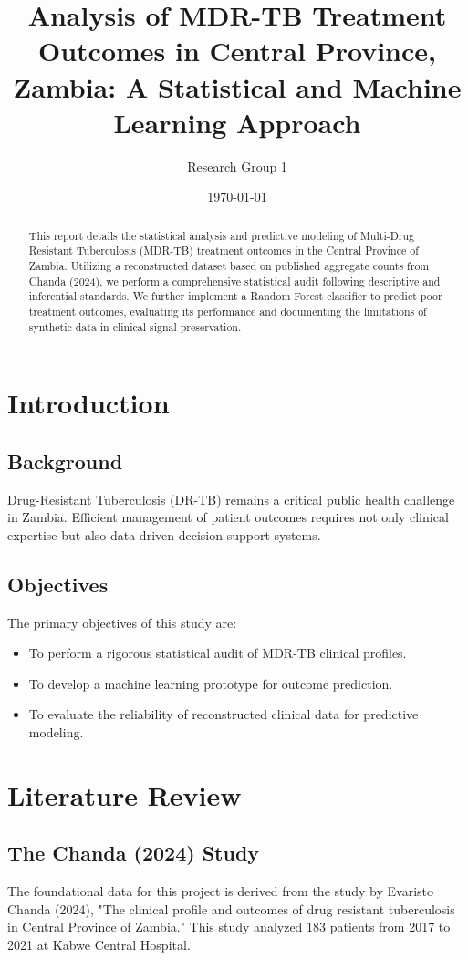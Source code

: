\documentclass[12pt,a4paper]{report}
\title{Analysis of MDR-TB Treatment Outcomes in Central Province, Zambia: A Statistical and Machine Learning Approach}
\author{Research Group 1}
\date{\today}
\begin{document}
\maketitle

\begin{abstract}
This report details the statistical analysis and predictive modeling of Multi-Drug Resistant Tuberculosis (MDR-TB) treatment outcomes in the Central Province of Zambia. Utilizing a reconstructed dataset based on published aggregate counts from Chanda (2024), we perform a comprehensive statistical audit following descriptive and inferential standards. We further implement a Random Forest classifier to predict poor treatment outcomes, evaluating its performance and documenting the limitations of synthetic data in clinical signal preservation.
\end{abstract}

\tableofcontents

\chapter{Introduction}
\section{Background}
Drug-Resistant Tuberculosis (DR-TB) remains a critical public health challenge in Zambia. Efficient management of patient outcomes requires not only clinical expertise but also data-driven decision-support systems.

\section{Objectives}
The primary objectives of this study are:
\begin{itemize}
    \item To perform a rigorous statistical audit of MDR-TB clinical profiles.
    \item To develop a machine learning prototype for outcome prediction.
    \item To evaluate the reliability of reconstructed clinical data for predictive modeling.
\end{itemize}

\chapter{Literature Review}
\section{The Chanda (2024) Study}
The foundational data for this project is derived from the study by Evaristo Chanda (2024), "The clinical profile and outcomes of drug resistant tuberculosis in Central Province of Zambia." This study analyzed 183 patients from 2017 to 2021 at Kabwe Central Hospital.
\end{document}
